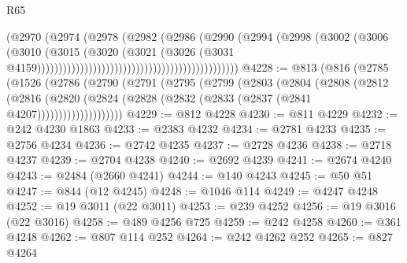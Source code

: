 \begin{lexlean}{R65}
\begin{coremodule}
{                                                                  (@2970
                                                                    (@2974
                                                                      (@2978
                                                                        (@2982
                                                                          (@2986
                                                                            (@2990
                                                                              (@2994
                                                                                (@2998
                                                                                  (@3002
                                                                                    (@3006
                                                                                      (@3010
                                                                                        (@3015
                                                                                          (@3020
                                                                                            (@3021
                                                                                              (@3026
                                                                                                (@3031
                                                                                                  @4159)))))))))))))))))))))))))))))))))))))))))))))))
@4228 := @813
    (@816
      (@2785
        (@1526
          (@2786
            (@2790
              (@2791
                (@2795
                  (@2799
                    (@2803
                      (@2804
                        (@2808
                          (@2812
                            (@2816
                              (@2820
                                (@2824 (@2828 (@2832 (@2833 (@2837 (@2841 @4207))))))))))))))))))))
@4229 := @812 @4228
@4230 := @811 @4229
@4232 := @242 @4230 @1863
@4233 := @2383 @4232
@4234 := @2781 @4233
@4235 := @2756 @4234
@4236 := @2742 @4235
@4237 := @2728 @4236
@4238 := @2718 @4237
@4239 := @2704 @4238
@4240 := @2692 @4239
@4241 := @2674 @4240
@4243 := @2484 (@2660 @4241)
@4244 := @140 @4243
@4245 := @50 @51
@4247 := @844 (@12 @4245)
@4248 := @1046 @114
@4249 := @4247 @4248
@4252 := @19 @3011 (@22 @3011)
@4253 := @239 @4252
@4256 := @19 @3016 (@22 @3016)
@4258 := @489 @4256 @725
@4259 := @242 @4258
@4260 := @361 @4248
@4262 := @807 @114 @252
@4264 := @242 @4262 @252
@4265 := @827 @4264
}
\end{coremodule}
\end{lexlean}
